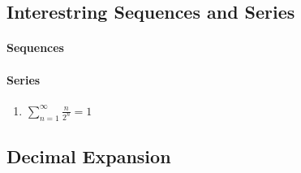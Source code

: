 \documentclass[../note.tex]{subfiles}
\begin{document}
\subsection{Interestring Sequences and Series}
\paragraph{Sequences}
\paragraph{Series}
\begin{enumerate}
	\item $\sum^{\infty}_{n=1}\frac{n}{2^n}=1$  
\end{enumerate}


\subsection{Decimal Expansion}
\end{document}

